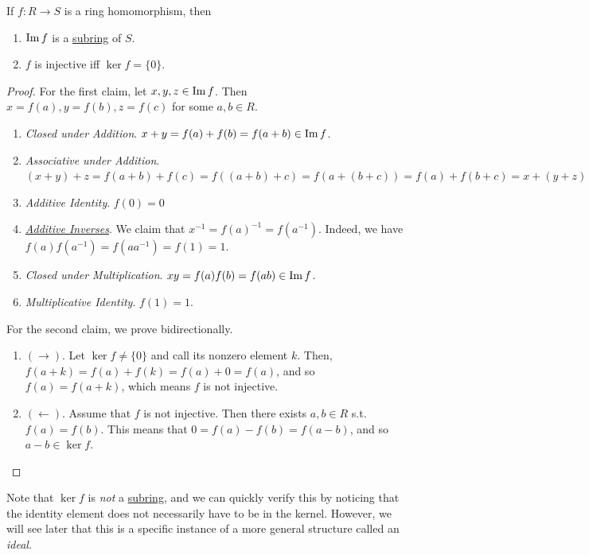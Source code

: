   \begin{lemma}
    \label{thm:images-and-kernels-of-ring-homomorphisms}
    If $f: R \rightarrow S$ is a ring homomorphism, then 
    \begin{enumerate}
      \item $\operatorname{Im}{f}$ is a \hyperref[def:subring]{subring} of $S$. 
      \item $f$ is injective iff $\ker{f} = \{0\}$. 
    \end{enumerate}
  \end{lemma}
  \begin{proof}
    For the first claim, let $x, y, z \in \operatorname{Im}{f}$. Then $x = f(a), y = f(b), z = f(c)$ for some $a, b \in R$. 
    \begin{enumerate}
      \item \textit{Closed under Addition}. $x + y = f(a) + f(b) = f(a + b) \in \operatorname{Im}{f}$. 
      \item \textit{Associative under Addition}. $(x + y) + z = f(a + b) + f(c) = f((a + b) + c) = f(a + (b + c)) = f(a) + f(b + c) = x + (y + z)$
      \item \textit{Additive Identity}. $f(0) = 0$
      \item \textit{\hyperref[thm:additive-inverses]{Additive Inverses}}. We claim that $x^{-1} = f(a)^{-1} = f(a^{-1})$. Indeed, we have $f(a) f(a^{-1}) = f(a a^{-1}) = f(1) = 1$. 
      \item \textit{Closed under Multiplication}. $xy = f(a) f(b) = f(ab) \in \operatorname{Im}{f}$. 
      \item \textit{Multiplicative Identity}. $f(1) = 1$. 
    \end{enumerate}
    For the second claim, we prove bidirectionally. 
    \begin{enumerate}
      \item $(\rightarrow)$. Let $\ker{f} \neq \{0\}$ and call its nonzero element $k$. Then, $f(a + k) = f(a) + f(k) = f(a) + 0 = f(a)$, and so $f(a) = f(a + k)$, which means $f$ is not injective. 
      \item $(\leftarrow)$. Assume that $f$ is not injective. Then there exists $a, b \in R$ s.t. $f(a) = f(b)$. This means that $0 = f(a) - f(b) = f(a - b)$, and so $a - b \in \ker{f}$. 
    \end{enumerate}
  \end{proof}

  Note that $\ker{f}$ is \textit{not} a \hyperref[def:subring]{subring}, and we can quickly verify this by noticing that the identity element does not necessarily have to be in the kernel. However, we will see later that this is a specific instance of a more general structure called an \textit{ideal}. 

